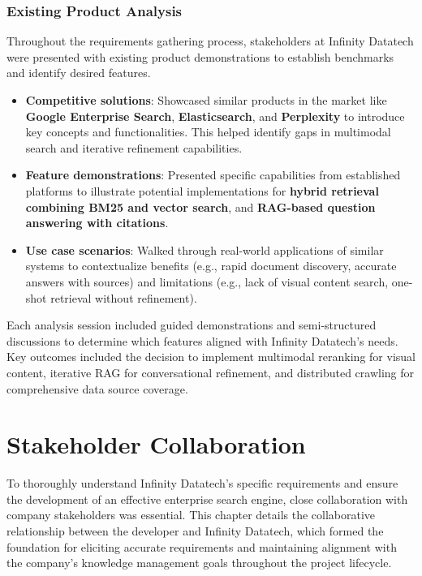 \documentclass{report}
\begin{document}
\subsection{Existing Product Analysis}
Throughout the requirements gathering process, stakeholders at Infinity Datatech were presented with existing product demonstrations to establish benchmarks and identify desired features.
\begin{itemize}
    \item \textbf{Competitive solutions}: Showcased similar products in the market like \textbf{Google Enterprise Search}, \textbf{Elasticsearch}, and \textbf{Perplexity} to introduce key concepts and functionalities. This helped identify gaps in multimodal search and iterative refinement capabilities.
    \item \textbf{Feature demonstrations}: Presented specific capabilities from established platforms to illustrate potential implementations for \textbf{hybrid retrieval combining BM25 and vector search}, and \textbf{RAG-based question answering with citations}.
    \item \textbf{Use case scenarios}: Walked through real-world applications of similar systems to contextualize benefits (e.g., rapid document discovery, accurate answers with sources) and limitations (e.g., lack of visual content search, one-shot retrieval without refinement).
\end{itemize}

Each analysis session included guided demonstrations and semi-structured discussions to determine which features aligned with Infinity Datatech's needs. Key outcomes included the decision to implement multimodal reranking for visual content, iterative RAG for conversational refinement, and distributed crawling for comprehensive data source coverage.

\chapter{Stakeholder Collaboration}

To thoroughly understand Infinity Datatech's specific requirements and ensure the development of an effective enterprise search engine, close collaboration with company stakeholders was essential. This chapter details the collaborative relationship between the developer and Infinity Datatech, which formed the foundation for eliciting accurate requirements and maintaining alignment with the company's knowledge management goals throughout the project lifecycle.
\end{document}
